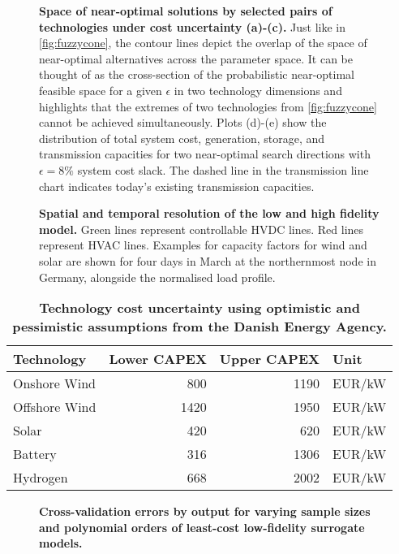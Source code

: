 \begin{figure}[H]
    \caption{ {\bf Space of near-optimal solutions by selected pairs of technologies
      under cost uncertainty (a)-(c).} Just like in \cref{fig:fuzzycone}, the
      contour lines depict the overlap of the space of near-optimal alternatives
      across the parameter space. It can be thought of as the cross-section of
      the probabilistic near-optimal feasible space for a given $\epsilon$ in
      two technology dimensions and highlights that the extremes of two
      technologies from \cref{fig:fuzzycone} cannot be achieved simultaneously.
      Plots (d)-(e) show the distribution of total system cost, generation,
      storage, and transmission capacities for two near-optimal search
      directions with $\epsilon=8\%$ system cost slack. The dashed line in the
      transmission line chart indicates today's existing transmission
      capacities. }
    \label{fig:dependencies}
\end{figure}

\begin{figure}[H]
    \caption{ {\bf Spatial and temporal resolution of the low and high fidelity model. }
    Green lines represent controllable HVDC lines. Red lines represent HVAC
    lines. Examples for capacity factors for wind and solar are shown for four
    days in March at the northernmost node in Germany, alongside the normalised
    load profile.}
    \label{fig:pypsaeur}
\end{figure}

\begin{table}[H]
    \begin{small}
        \begin{tabular}{lrrl}
            \toprule
            Technology & Lower CAPEX & Upper CAPEX & Unit  \\ \midrule Onshore
            Wind & 800 & 1190 & EUR/kW \\
            Offshore Wind & 1420 & 1950 & EUR/kW \\
            Solar & 420 & 620 & EUR/kW \\
            Battery & 316 & 1306 & EUR/kW \\
            Hydrogen & 668 & 2002 & EUR/kW \\ \bottomrule
        \end{tabular}
    \end{small}
    \caption{ {\bf Technology cost uncertainty using
    optimistic and pessimistic assumptions from the Danish Energy
    Agency.\cite{DEA} }}
    \label{tab:costuncertainty}
\end{table}


\begin{figure}[H]
    \caption{ {\bf Cross-validation errors by output for
    varying sample sizes and polynomial orders of least-cost low-fidelity
    surrogate models. }}
    \label{fig:error}
\end{figure}